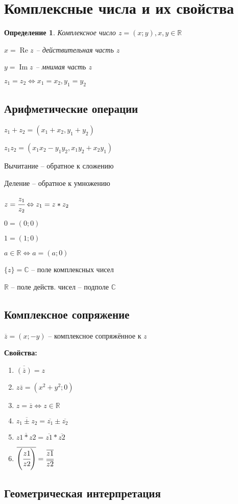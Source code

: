 \documentclass[draft]{article}
\newcommand{\R}{\mathbb{R}}
\renewcommand{\C}{\mathbb{C}}
\newcommand{\LRA}{\Leftrightarrow}
\renewcommand{\bar}{\overline}
\renewcommand{\Im}{\mathop{\mathrm{Im}}\nolimits}
\renewcommand{\Re}{\mathop{\mathrm{Re}}\nolimits}
\newcommand{\opr}[1]{\begin{opred}#1\end{opred}}
\newtheorem*{opred}{Определение}
\theoremstyle{remark}
\begin{document}
\section{Комплексные числа и их свойства}
\opr{Комплексное число $z=(x;y), x,y\in\R$

$x=\Re z$ -- действительная часть $z$

$y=\Im z$ -- мнимая часть $z$}

$z_1=z_2 \LRA x_1=x_2, y_1=y_2$
\subsection{Арифметические операции}
$z_1+z_2=(x_1+x_2,y_1+y_2)$

$z_1z_2=(x_1x_2-y_1y_2,x_1y_2+x_2y_1)$

Вычитание -- обратное к сложению

Деление -- обратное к умножению

$z=\cfrac{z_1}{z_2} \LRA z_1=z*z_2$

$0=(0;0)$

$1=(1;0)$

$a\in\R\LRA a=(a;0)$

$\{z\}=\C$ -- поле комплексных чисел

$\R$ -- поле действ. чисел -- подполе $\C$
\subsection{Комплексное сопряжение}

$\bar{z}=(x;-y)$ -- комплексное сопряжённое к $z$

{\bfseries Свойства:}
\begin{enumerate}
\item$\bar{\left(\bar{z}\right)}=z$
\item$z\bar{z}=(x^2+y^2;0)$
\item$z=\bar{z}\LRA z\in\R$
\item$\bar{z_1\pm z_2}=\bar{z_1}\pm\bar{z_2}$
\item$\bar{z1*z2}=\bar{z1}*\bar{z2}$
\item$\bar{\left(\cfrac{z1}{z2}\right)}=\cfrac{\bar{z1}}{\bar{z2}}$
\end{enumerate}
\subsection{Геометрическая интерпретация}
\end{document}
